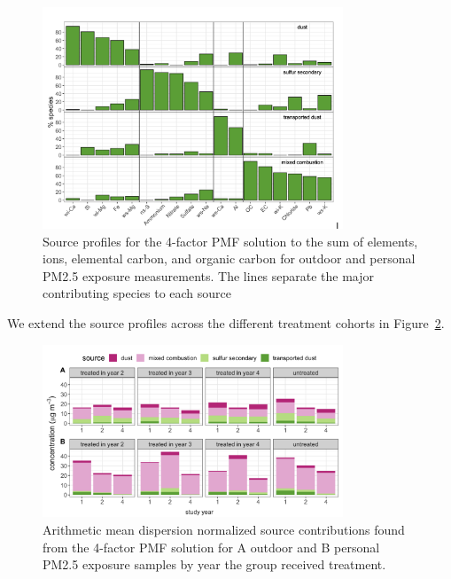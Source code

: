 \documentclass[
  letterpaper,
  DIV=11,
  numbers=noendperiod]{scrartcl}
\begin{document}
\begin{figure}[H]

{\centering \includegraphics[width=0.8\textwidth,height=\textheight]{images/source-figure.png}

}

\caption{\label{fig-source-figure}Source profiles for the 4-factor PMF
solution to the sum of elements, ions, elemental carbon, and organic
carbon for outdoor and personal PM2.5 exposure measurements. The lines
separate the major contributing species to each source}

\end{figure}

We extend the source profiles across the different treatment cohorts in
Figure~\ref{fig-source-season}.

\begin{figure}[H]

{\centering \includegraphics[width=0.8\textwidth,height=\textheight]{images/source-season.png}

}

\caption{\label{fig-source-season}Arithmetic mean dispersion normalized
source contributions found from the 4-factor PMF solution for A outdoor
and B personal PM2.5 exposure samples by year the group received
treatment.}

\end{figure}
\end{document}
